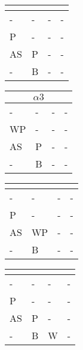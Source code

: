 \documentclass{math}
\begin{document}
\begin{center}
  \begin{tabular}{|p{0.6cm}|p{0.6cm}|p{0.6cm}|p{0.6cm}|}
    \hline
    \multicolumn{4}{|c|}{} \\ \hline
    - & - & - & - \\ \hline
    P & - & - & - \\ \hline
    AS & P & - & - \\ \hline
    - & B & - & - \\ \hline
  \end{tabular}
  \begin{tabular}{|p{0.6cm}|p{0.6cm}|p{0.6cm}|p{0.6cm}|}
    \hline
    \multicolumn{4}{|c|}{\( \alpha3 \)} \\ \hline
    - & - & - & - \\ \hline
    WP & - & - & - \\ \hline
    AS & P & - & - \\ \hline
    - & B & - & - \\ \hline
  \end{tabular}
  \begin{tabular}{|p{0.6cm}|p{0.6cm}|p{0.6cm}|p{0.6cm}|}
    \hline
    \multicolumn{4}{|c|}{} \\ \hline
    - & - & - & - \\ \hline
    P & - & - & - \\ \hline
    AS & WP & - & - \\ \hline
    - & B & - & - \\ \hline
  \end{tabular}
  \begin{tabular}{|p{0.6cm}|p{0.6cm}|p{0.6cm}|p{0.6cm}|}
    \hline
    \multicolumn{4}{|c|}{} \\ \hline
    - & - & - & - \\ \hline
    P & - & - & - \\ \hline
    AS & P & - & - \\ \hline
    - & B & W & - \\ \hline
  \end{tabular} \\[0.5cm]


\end{center}
\end{document}
